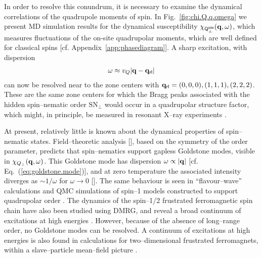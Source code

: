 \documentclass[apsrev4-1,prx,superscriptaddress,floatfix,twocolumn,longbibliography]{revtex4-1}
\begin{document}
In order to resolve this conundrum, it is necessary to examine the dynamical correlations 
of the quadrupole moments of spin.
%
In Fig.~\ref{fig:chi.Q.q.omega} we present MD simulation results for the dynamical 
susceptibility $\chi_{\sf Q_\perp^{\sf site}}({\bf q}, \omega)$, 
which measures fluctuations of the on-site quadrupolar moments,
which are well defined for classical spins [cf. Appendix~\ref{app:phasediagram}].
%
A sharp excitation, with  dispersion
%
\begin{eqnarray}
\omega \approx v_Q |{\bf q} - {\bf q}_{\sf rl}|
\label{eq:goldstone.mode}
\end{eqnarray}
%
can now be resolved near to 
the zone centers with \mbox{${\bf q}_{\sf rl} = (0,0,0), (1,1,1), (2,2,2)$}.   
% 
These are the same zone centers for which the Bragg peaks associated with 
the hidden spin--nematic order $\text{SN}_\perp$  would occur in a quadrupolar 
structure factor, which might, in principle, be measured in resonant X--ray 
experiments \cite{Savary15a}.


At present, relatively little is known about the dynamical properties of spin--nematic 
states.
%
Field--theoretic analysis [], 
based on the symmetry of the order parameter, predicts that spin--nematics support 
gapless Goldstone modes, visible in $\chi_{Q_\perp}({\bf q}, \omega)$.  
%
This Goldstone mode has dispersion $\omega \propto |{\bf q}|$ [cf. Eq.~(\ref{eq:goldstone.mode})], 
and at zero temperature the associated intensity diverges as 
$\sim 1/\omega$ for $\omega \to 0$ [].  
%
The same behaviour is seen in ``flavour--wave'' calculations 
and QMC simulations of spin--1 models constructed to support quadrupolar 
order \cite{tsunetsugu06,laeuchli06,voell15}.
%
The dynamics of the spin--1/2 frustrated ferromagnetic spin chain have also been studied
using DMRG, and reveal a broad continuum of excitations at high energies \cite{onishi15}.
%
However, because of the absence of long--range order, no Goldstone modes can be 
resolved.
%
A continuum of excitations at high energies is also found in calculations for two--dimensional 
frustrated ferromagnets, within a slave--particle mean--field picture \cite{shindou13}.    

\end{document}
